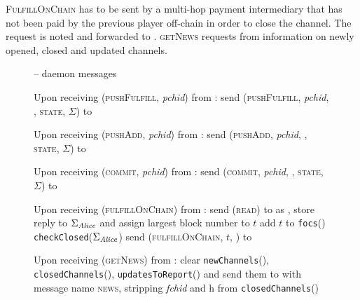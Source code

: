   \textsc{FulfillOnChain} has to be sent by a multi-hop payment intermediary
  that has not been paid by the previous player off-chain in order to close the
  channel. The request is noted and forwarded to \simulator. \textsc{getNews}
  requests from \fpaynet{} information on newly opened, closed and updated
  channels.

  \begin{figure}[H]
    \begin{systembox}{\fpaynet{} -- daemon messages}
      \begin{algorithmic}[1]
        \State Upon receiving (\textsc{pushFulfill}, \textit{pchid}) from
        \alice:
        \Indent
          \State send (\textsc{pushFulfill}, \textit{pchid}, \alice,
          \textsc{state}, $\Sigma$) to \simulator
          \label{alg:fpaynet:daemon:fulfill}
        \EndIndent
        \Statex

        \State Upon receiving (\textsc{pushAdd}, \textit{pchid}) from \alice:
        \Indent
          \State send (\textsc{pushAdd}, \textit{pchid}, \alice, \textsc{state},
          $\Sigma$) to \simulator
          \label{alg:fpaynet:daemon:add}
        \EndIndent
        \Statex

        \State Upon receiving (\textsc{commit}, \textit{pchid}) from \alice:
        \Indent
          \State send (\textsc{commit}, \textit{pchid}, \alice, \textsc{state},
          $\Sigma$) to \simulator
          \label{alg:fpaynet:daemon:commit}
        \EndIndent
        \Statex

        \State Upon receiving (\textsc{fulfillOnChain}) from \alice:
        \Indent
          \State send (\textsc{read}) to \ledger{} as \alice{}, store reply to
          $\Sigma_{\mathit{Alice}}$ and assign largest block number to $t$
          \label{alg:fpaynet:daemon:foc:read}
          \State add $t$ to \texttt{focs}(\alice)
          \State \texttt{checkClosed}($\Sigma_{\mathit{Alice}}$)
          \State send (\textsc{fulfillOnChain}, $t$, \alice) to \simulator
        \EndIndent
        \Statex

        \State Upon receiving (\textsc{getNews}) from \alice:
        \label{alg:fpaynet:getnews}
        \Indent
          \State clear \texttt{newChannels}(\alice),
          \texttt{closedChannels}(\alice), \texttt{updatesToReport}(\alice) and
          send them to \alice{} with message name \textsc{news}, stripping
          \textit{fchid} and h from \texttt{closedChannels}(\alice)
          \label{alg:fpaynet:getnews:send}
        \EndIndent
      \end{algorithmic}
    \end{systembox}
    \caption{}
    \label{alg:fpaynet:daemon}
  \end{figure}
